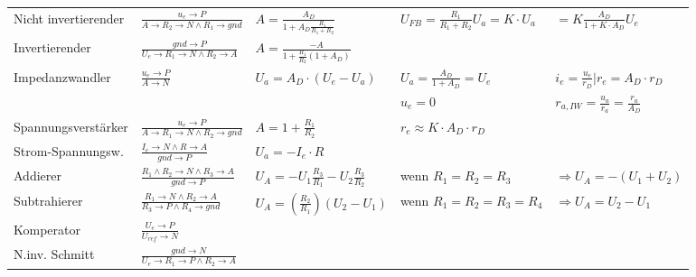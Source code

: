 \documentclass{article}
\begin{document}
\begin{table}
    \begin{tabular}{lllll}
     Nicht invertierender  & $\frac{u_e\rightarrow P}{A\rightarrow R_2 \rightarrow N\wedge R_1\rightarrow gnd}$ & $A=\frac{A_D}{1+A_D\frac{R_1}{R_1+R_2}}$ &  $U_{FB}= \frac{R_1}{R_1+R_2}U_a=K\cdot U_a$&$=K\frac{A_D}{1+K\cdot A_D}U_e$  \\
     Invertierender & $\frac{gnd\rightarrow P}{U_e\rightarrow R_1 \rightarrow N\wedge R_2 \rightarrow A}$ & $A=\frac{-A}{1+\frac{R_1}{R_2}(1+A_D)}$ &  &  \\
     Impedanzwandler & $\frac{u_e\rightarrow P}{A\rightarrow N}$ & $U_a=A_D\cdot (U_e-U_a)$  & $U_a=\frac{A_D}{1+A_D}=U_e$ & $i_e=\frac{u_e}{r_D}|r_e=A_D\cdot r_D$ \\
     &  &  & $u_e = 0$ & $ r_{a,IW}=\frac{u_a}{r_a}=\frac{r_a}{A_D}$\\
     Spannungsverstärker & $\frac{u_e\rightarrow P}{A\rightarrow R_1\rightarrow N\wedge R_2\rightarrow gnd}$ & $A=1+\frac{R_1}{R_2}$ & $r_e\approx K\cdot A_D\cdot r_D$ &\\
     Strom-Spannungsw.& $\frac{I_e\rightarrow N\wedge R\rightarrow A}{gnd\rightarrow P}$ & $U_a=-I_e\cdot R$ &  &\\
     Addierer& $\frac{R_1\wedge R_2 \rightarrow N\wedge R_3 \rightarrow A}{gnd\rightarrow P}$ & $ U_A=-U_1\frac{R_3}{R_1}-U_2\frac{R_3}{R_2}$ & wenn $R_1=R_2=R_3$ & $\Rightarrow U_A=-(U_1+U_2)$ \\
     Subtrahierer& $\frac{R_1\rightarrow N\wedge R_2\rightarrow A}{R_3\rightarrow P \wedge R_4\rightarrow gnd}$  & $U_A=(\frac{R_2}{R_1})(U_2-U_1)$ & wenn $R_1=R_2=R_3=R_4$ & $\Rightarrow U_A=U_2-U_1$\\
     Komperator & $\frac{U_e\rightarrow P}{U_{ref}\rightarrow N}$ &  &  &\\
     N.inv. Schmitt& $\frac{gnd\rightarrow N}{U_e\rightarrow R_1 \rightarrow P\wedge R_2\rightarrow A}$ &  &  &
    \end{tabular}
    \end{table}
\end{document}
